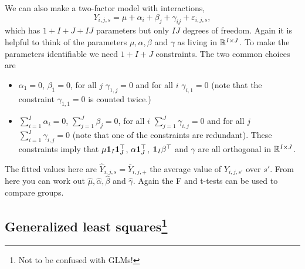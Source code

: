 We can also make a two-factor model with interactions,
\begin{equation}
    \label{ANOVA3} Y_{i,j,s} = \mu + \alpha_i + \beta_j + \gamma_{ij} + \varepsilon_{i,j,s},
\end{equation}
which has $1+I+J+IJ$ parameters but only $IJ$ degrees of freedom. Again it is helpful to think of the parameters $\mu,\alpha,\beta$ and $\gamma$ as living in $\mathbb{R}^{I\times J}$. To make the parameters identifiable we need $1+I+J$ constraints. The two common choices are
\begin{itemize}
    \item $\alpha_1 = 0$, $\beta_1=0$, for all $j$ $\gamma_{1,j}=0$ and for all $i$ $\gamma_{i,1}=0$ (note that the constraint $\gamma_{1,1}=0$ is counted twice.)
    \item $\sum_{i=1}^I \alpha_i = 0$, $\sum_{j=1}^J \beta_j = 0$, for all $i$ $\sum_{j=1}^J\gamma_{i,j}=0$ and for all $j$ $\sum_{i=1}^I \gamma_{i,j} = 0$ (note that one of the constraints are redundant). These constraints imply that $\mu \mathbf 1_I \mathbf 1_J^\top $, $\alpha \mathbf 1_J^\top$, $\mathbf 1_I \beta^\top$ and $\gamma$ are all orthogonal in $\mathbb{R}^{I \times J}$.
\end{itemize}
The fitted values here are $\hat{Y}_{i,j,s} = \bar{Y}_{i,j,+}$ the average value of $Y_{i,j,s'}$ over $s'$. From here you can work out $\hat{\mu},\hat{\alpha},\hat{\beta}$ and $\hat{\gamma}$. Again the F and t-tests can be used to compare groups. 


\subsection{Generalized least squares\footnote{Not to be confused with GLMs!}}\label{sec:gls}

